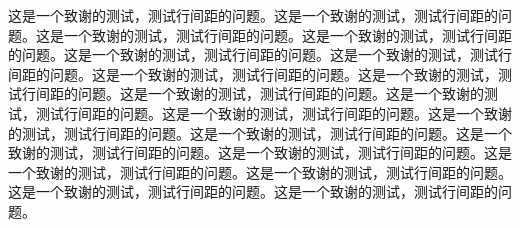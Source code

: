 \documentclass{NauThesis}
\begin{document}
\begin{ThanksPage}
    这是一个致谢的测试，测试行间距的问题。这是一个致谢的测试，测试行间距的问题。这是一个致谢的测试，测试行间距的问题。这是一个致谢的测试，测试行间距的问题。这是一个致谢的测试，测试行间距的问题。这是一个致谢的测试，测试行间距的问题。这是一个致谢的测试，测试行间距的问题。这是一个致谢的测试，测试行间距的问题。这是一个致谢的测试，测试行间距的问题。这是一个致谢的测试，测试行间距的问题。这是一个致谢的测试，测试行间距的问题。这是一个致谢的测试，测试行间距的问题。这是一个致谢的测试，测试行间距的问题。这是一个致谢的测试，测试行间距的问题。这是一个致谢的测试，测试行间距的问题。这是一个致谢的测试，测试行间距的问题。这是一个致谢的测试，测试行间距的问题。这是一个致谢的测试，测试行间距的问题。这是一个致谢的测试，测试行间距的问题。
\end{ThanksPage}
\end{document}
